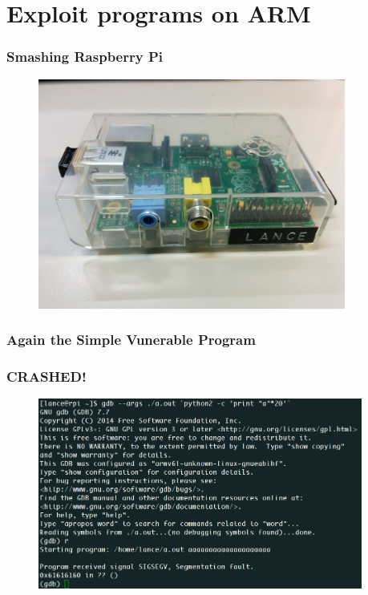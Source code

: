 \documentclass[t,xcolor=table,usenames,dvipsnames]{beamer}
\begin{document}
\section{Exploit programs on ARM}
\begin{frame}
    \sectionpage
\end{frame}

\begin{frame}
    \frametitle{Smashing Raspberry Pi}
    \begin{figure}
    \includegraphics[width=0.9\textwidth]{img/rpi.jpg}
    \end{figure}
\end{frame}

\begin{frame}
    \frametitle{Again the Simple Vunerable Program}
    
\end{frame}

\begin{frame}
    \frametitle{CRASHED!}
    \begin{figure}
    \includegraphics[width=0.95\textwidth]{img/arm-crash}
    \end{figure}
\end{frame}
\end{document}
